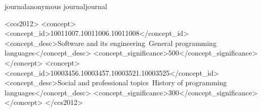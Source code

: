 \documentclass[acmsmall,screen,review]{acmart}
\def\acmversionanonymous{anonymous}
\def\acmversionjournal{journal}
\def\acmversion{anonymous}
\def\acmversion{journal}
\begin{document}
\ifx\acmversion\acmversionanonymous
  \renewcommand\footnotetextcopyrightpermission[1]{} %
\fi
\ifx\acmversion\acmversionjournal
  \begin{CCSXML}
    <ccs2012>
    <concept>
    <concept_id>10011007.10011006.10011008</concept_id>
    <concept_desc>Software and its engineering~General programming languages</concept_desc>
    <concept_significance>500</concept_significance>
    </concept>
    <concept>
    <concept_id>10003456.10003457.10003521.10003525</concept_id>
    <concept_desc>Social and professional topics~History of programming languages</concept_desc>
    <concept_significance>300</concept_significance>
    </concept>
    </ccs2012>
  \end{CCSXML}


\fi

\maketitle
\end{document}
